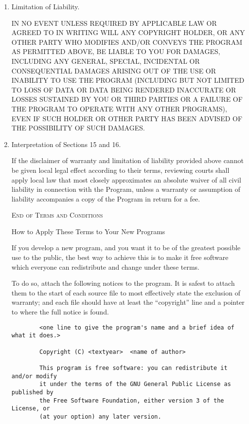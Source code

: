 \begin{enumerate}
	\item Limitation of Liability.
	
	IN NO EVENT UNLESS REQUIRED BY APPLICABLE LAW OR AGREED TO IN
	WRITING WILL ANY COPYRIGHT HOLDER, OR ANY OTHER PARTY WHO MODIFIES
	AND/OR CONVEYS THE PROGRAM AS PERMITTED ABOVE, BE LIABLE TO YOU FOR
	DAMAGES, INCLUDING ANY GENERAL, SPECIAL, INCIDENTAL OR CONSEQUENTIAL
	DAMAGES ARISING OUT OF THE USE OR INABILITY TO USE THE PROGRAM
	(INCLUDING BUT NOT LIMITED TO LOSS OF DATA OR DATA BEING RENDERED
	INACCURATE OR LOSSES SUSTAINED BY YOU OR THIRD PARTIES OR A FAILURE
	OF THE PROGRAM TO OPERATE WITH ANY OTHER PROGRAMS), EVEN IF SUCH
	HOLDER OR OTHER PARTY HAS BEEN ADVISED OF THE POSSIBILITY OF SUCH
	DAMAGES.
	
	\item Interpretation of Sections 15 and 16.
	
	If the disclaimer of warranty and limitation of liability provided
	above cannot be given local legal effect according to their terms,
	reviewing courts shall apply local law that most closely approximates
	an absolute waiver of all civil liability in connection with the
	Program, unless a warranty or assumption of liability accompanies a
	copy of the Program in return for a fee.
	
	\begin{center}
		{\Large\textsc{End of Terms and Conditions}}
		
		\bigskip
		How to Apply These Terms to Your New Programs
	\end{center}
	
	If you develop a new program, and you want it to be of the greatest
	possible use to the public, the best way to achieve this is to make it
	free software which everyone can redistribute and change under these terms.
	
	To do so, attach the following notices to the program.  It is safest
	to attach them to the start of each source file to most effectively
	state the exclusion of warranty; and each file should have at least
	the ``copyright'' line and a pointer to where the full notice is found.
	
	{\footnotesize
		\begin{verbatim}
		<one line to give the program's name and a brief idea of what it does.>
		
		Copyright (C) <textyear>  <name of author>
		
		This program is free software: you can redistribute it and/or modify
		it under the terms of the GNU General Public License as published by
		the Free Software Foundation, either version 3 of the License, or
		(at your option) any later version.
		

\end{verbatim}}
\end{enumerate}
